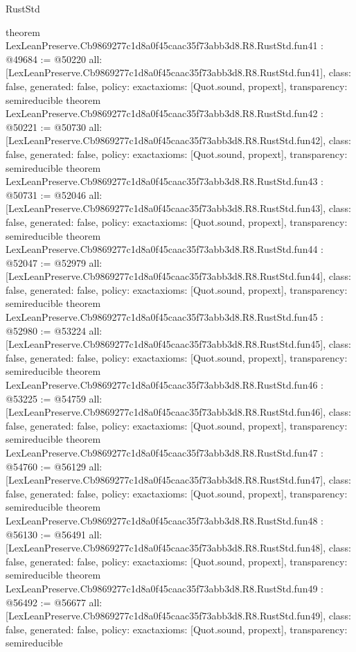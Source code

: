 \begin{lexlean}{RustStd}
\begin{coremodule}
{}
theorem LexLeanPreserve.Cb9869277c1d8a0f45caac35f73abb3d8.R8.RustStd.fun41 : @49684 := @50220 {
  all: [LexLeanPreserve.Cb9869277c1d8a0f45caac35f73abb3d8.R8.RustStd.fun41],
  class: false,
  generated: false,
  policy: exact{axioms: [Quot.sound, propext]},
  transparency: semireducible
}
theorem LexLeanPreserve.Cb9869277c1d8a0f45caac35f73abb3d8.R8.RustStd.fun42 : @50221 := @50730 {
  all: [LexLeanPreserve.Cb9869277c1d8a0f45caac35f73abb3d8.R8.RustStd.fun42],
  class: false,
  generated: false,
  policy: exact{axioms: [Quot.sound, propext]},
  transparency: semireducible
}
theorem LexLeanPreserve.Cb9869277c1d8a0f45caac35f73abb3d8.R8.RustStd.fun43 : @50731 := @52046 {
  all: [LexLeanPreserve.Cb9869277c1d8a0f45caac35f73abb3d8.R8.RustStd.fun43],
  class: false,
  generated: false,
  policy: exact{axioms: [Quot.sound, propext]},
  transparency: semireducible
}
theorem LexLeanPreserve.Cb9869277c1d8a0f45caac35f73abb3d8.R8.RustStd.fun44 : @52047 := @52979 {
  all: [LexLeanPreserve.Cb9869277c1d8a0f45caac35f73abb3d8.R8.RustStd.fun44],
  class: false,
  generated: false,
  policy: exact{axioms: [Quot.sound, propext]},
  transparency: semireducible
}
theorem LexLeanPreserve.Cb9869277c1d8a0f45caac35f73abb3d8.R8.RustStd.fun45 : @52980 := @53224 {
  all: [LexLeanPreserve.Cb9869277c1d8a0f45caac35f73abb3d8.R8.RustStd.fun45],
  class: false,
  generated: false,
  policy: exact{axioms: [Quot.sound, propext]},
  transparency: semireducible
}
theorem LexLeanPreserve.Cb9869277c1d8a0f45caac35f73abb3d8.R8.RustStd.fun46 : @53225 := @54759 {
  all: [LexLeanPreserve.Cb9869277c1d8a0f45caac35f73abb3d8.R8.RustStd.fun46],
  class: false,
  generated: false,
  policy: exact{axioms: [Quot.sound, propext]},
  transparency: semireducible
}
theorem LexLeanPreserve.Cb9869277c1d8a0f45caac35f73abb3d8.R8.RustStd.fun47 : @54760 := @56129 {
  all: [LexLeanPreserve.Cb9869277c1d8a0f45caac35f73abb3d8.R8.RustStd.fun47],
  class: false,
  generated: false,
  policy: exact{axioms: [Quot.sound, propext]},
  transparency: semireducible
}
theorem LexLeanPreserve.Cb9869277c1d8a0f45caac35f73abb3d8.R8.RustStd.fun48 : @56130 := @56491 {
  all: [LexLeanPreserve.Cb9869277c1d8a0f45caac35f73abb3d8.R8.RustStd.fun48],
  class: false,
  generated: false,
  policy: exact{axioms: [Quot.sound, propext]},
  transparency: semireducible
}
theorem LexLeanPreserve.Cb9869277c1d8a0f45caac35f73abb3d8.R8.RustStd.fun49 : @56492 := @56677 {
  all: [LexLeanPreserve.Cb9869277c1d8a0f45caac35f73abb3d8.R8.RustStd.fun49],
  class: false,
  generated: false,
  policy: exact{axioms: [Quot.sound, propext]},
  transparency: semireducible
}
\end{coremodule}
\end{lexlean}
